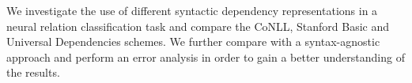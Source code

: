 We investigate the use of different syntactic dependency representations in a neural relation classification task and compare the CoNLL, Stanford Basic and Universal Dependencies schemes. We further compare with a syntax-agnostic approach and perform an error analysis in order to gain a better understanding of the results.

